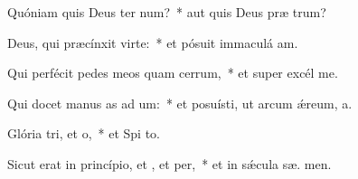 \item Quóniam quis Deus ter num?~* aut quis Deus præ  trum?
\item Deus, qui præcínxit  virte:~* et pósuit immaculá  am.
\item Qui perfécit pedes meos quam cerrum,~* et super excél  me.
\item Qui docet manus as ad um:~* et posuísti, ut arcum ǽreum,  a.
\item Glória tri, et o,~* et Spi to.
\item Sicut erat in princípio, et , et per,~* et in sǽcula sæ. men.
